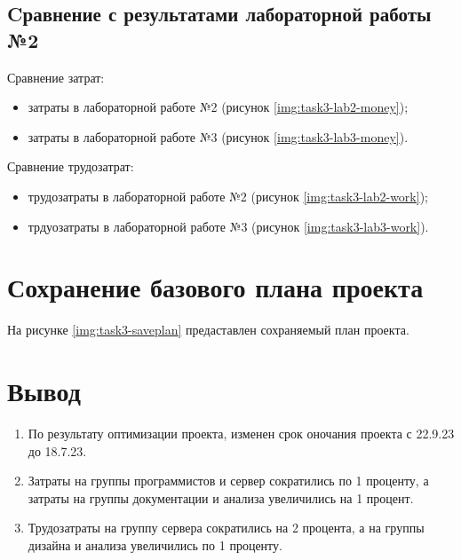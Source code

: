 

\clearpage

\subsection{Cравнение с результатами лабораторной работы №2}

Сравнение затрат:

\begin{itemize}
    \item затраты в лабораторной работе №2 (рисунок \ref{img:task3-lab2-money});
    \item затраты в лабораторной работе №3 (рисунок \ref{img:task3-lab3-money}).
\end{itemize}


Сравнение трудозатрат:

\begin{itemize}
    \item трудозатраты в лабораторной работе №2 (рисунок \ref{img:task3-lab2-work});
    \item трдуозатраты в лабораторной работе №3 (рисунок \ref{img:task3-lab3-work}).
\end{itemize}



\section{Сохранение базового плана проекта}

На рисунке \ref{img:task3-saveplan} предаставлен сохраняемый план проекта.



\section*{Вывод}

\begin{enumerate}
    \item По результату оптимизации проекта, изменен срок оночания проекта с 22.9.23 до 18.7.23.
    \item Затраты на группы программистов и сервер сократились по 1 проценту, а затраты на группы документации и анализа увеличились на 1 процент.
    \item Трудозатраты на группу сервера сократились на 2 процента, а на группы дизайна и анализа увеличились по 1 проценту.
\end{enumerate}

